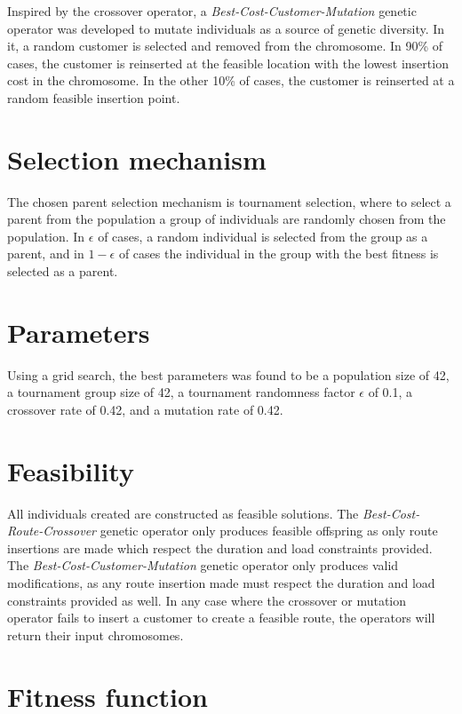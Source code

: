 \documentclass[paper=a4, fontsize=10pt]{scrartcl}
\begin{document}
\begin{multicols}{2}
Inspired by the crossover operator, a \textit{Best-Cost-Customer-Mutation} genetic operator was developed to mutate individuals as a source of genetic diversity. In it, a random customer is selected and removed from the chromosome. In 90\% of cases, the customer is reinserted at the feasible location with the lowest insertion cost in the chromosome. In the other 10\% of cases, the customer is reinserted at a random feasible insertion point.

\section*{Selection mechanism}

The chosen parent selection mechanism is tournament selection, where to select a parent from the population a group of individuals are randomly chosen from the population. In $\epsilon$ of cases, a random individual is selected from the group as a parent, and in $1 - \epsilon$ of cases the individual in the group with the best fitness is selected as a parent.

\section*{Parameters}

Using a grid search, the best parameters was found to be a population size of 42, a tournament group size of 42, a tournament randomness factor $\epsilon$ of 0.1, a crossover rate of 0.42, and a mutation rate of 0.42.

\section*{Feasibility}

All individuals created are constructed as feasible solutions. The \textit{Best-Cost-Route-Crossover} genetic operator only produces feasible offspring as only route insertions are made which respect the duration and load constraints provided. The \textit{Best-Cost-Customer-Mutation} genetic operator only produces valid modifications, as any route insertion made must respect the duration and load constraints provided as well. In any case where the crossover or mutation operator fails to insert a customer to create a feasible route, the operators will return their input chromosomes.

\section*{Fitness function}


\end{multicols}
\end{document}
